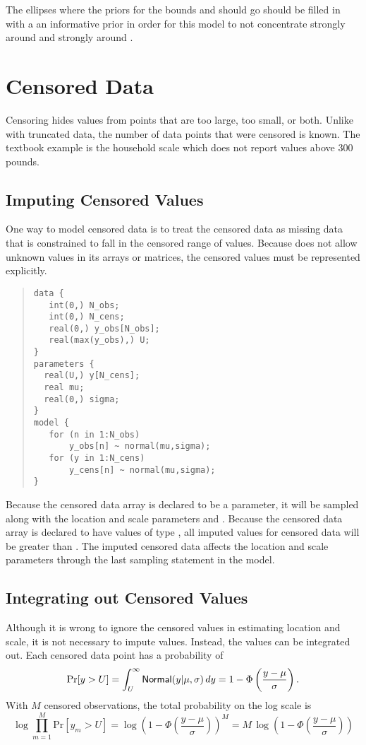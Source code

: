 The ellipses where the priors for the bounds  and 
should go should be filled in with a an informative prior in
order for this model to not concentrate  strongly around 
 and  strongly around .


\section{Censored Data}

Censoring hides values from points that are too large, too small, or
both.  Unlike with truncated data, the number of data points that were
censored is known.  The textbook example is the household scale which
does not report values above 300 pounds.  

\subsection{Imputing Censored Values}

One way to model censored data is to treat the censored data as
missing data that is constrained to fall in the censored range of
values.  Because \Stan does not allow unknown values in its arrays or
matrices, the censored values must be represented explicitly.
%
\begin{quote}
\begin{Verbatim}
data {
   int(0,) N_obs;
   int(0,) N_cens;
   real(0,) y_obs[N_obs];
   real(max(y_obs),) U;
}
parameters {
  real(U,) y[N_cens];
  real mu;
  real(0,) sigma;
}
model {
   for (n in 1:N_obs)
       y_obs[n] ~ normal(mu,sigma);
   for (y in 1:N_cens)
       y_cens[n] ~ normal(mu,sigma);
}
\end{Verbatim}
\end{quote}
%
Because the censored data array  is declared to be a parameter, it
will be sampled along with the location and scale parameters 
and .  Because the censored data array  is
declared to have values of type , all imputed values
for censored data will be greater than .  The imputed censored
data affects the location and scale parameters through the last
sampling statement in the model.  

\subsection{Integrating out Censored Values}

Although it is wrong to ignore the censored values in estimating
location and scale, it is not necessary to impute values.  Instead,
the values can be integrated out.  Each censored data point has a
probability of
%
\[
\mbox{Pr}[y > U] 
= \int_U^{\infty} \mbox{\sf Normal}(y|\mu,\sigma) \, dy
= 1 - \Phi\left(\frac{y - \mu}{\sigma}\right).
\]
%
With $M$ censored observations, the total probability on the log scale
is
\[
\log \prod_{m=1}^M \mbox{Pr}[y_m > U]
= \log \left( 1 - \Phi\left(\frac{y - \mu}{\sigma}\right)\right)^{M}
= M \, \log \left( 1 - \Phi\left(\frac{y - \mu}{\sigma}\right)\right)
\]

